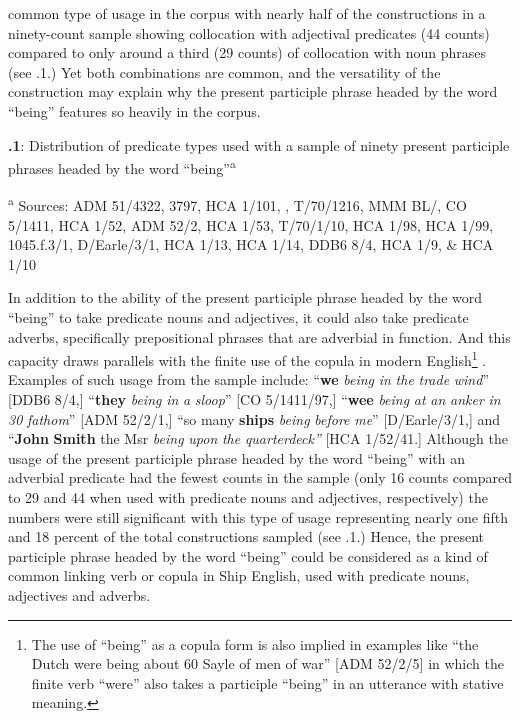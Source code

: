 common type of usage in the corpus with nearly half of the constructions in a ninety-count sample showing collocation with adjectival predicates (44 counts) compared to only around a third (29 counts) of collocation with noun phrases (see .1.) Yet both combinations are common, and the versatility of the construction may explain why the present participle phrase headed by the word “being” features so heavily in the corpus. 


\textbf{.1}: Distribution of predicate types used with a sample of ninety present participle phrases headed by the word “being”\textsuperscript{a} 

\textsuperscript{a} Sources: ADM 51/4322, 3797, HCA 1/101, \citealt{Brown2011}, T/70/1216, MMM BL/\citealt{Egerton2395}, CO 5/1411, HCA 1/52, ADM 52/2, HCA 1/53, T/70/1/10, HCA 1/98, HCA 1/99, 1045.f.3/1, D/Earle/3/1, HCA 1/13, HCA 1/14, DDB6 8/4, HCA 1/9, \& HCA 1/10

In addition to the ability of the present participle phrase headed by the word “being” to take predicate nouns and adjectives, it could also take predicate adverbs, specifically prepositional phrases that are adverbial in function. And this capacity draws parallels with the finite use of the copula in modern English\footnote{The use of “being” as a copula form is also implied in examples like “the Dutch were being about 60 Sayle of men of war” [ADM 52/2/5] in which the finite verb “were” also takes a participle “being” in an utterance with stative meaning.} . Examples of such usage from the sample include: “\textbf{we} \textit{being} \textit{in} \textit{the} \textit{trade} \textit{wind}” [DDB6 8/4,] “\textbf{they} \textit{being} \textit{in} \textit{a} \textit{sloop}” [CO 5/1411/97,] “\textbf{wee} \textit{being} \textit{at} \textit{an} \textit{anker} \textit{in} \textit{30} \textit{fathom}” [ADM 52/2/1,] “so many \textbf{ships} \textit{being} \textit{before} \textit{me}” [D/Earle/3/1,] and “\textbf{John} \textbf{Smith} the Msr \textit{being} \textit{upon} \textit{the} \textit{quarterdeck”} [HCA 1/52/41.] Although the usage of the present participle phrase headed by the word “being” with an adverbial predicate had the fewest counts in the sample (only 16 counts compared to 29 and 44 when used with predicate nouns and adjectives, respectively) the numbers were still significant with this type of usage representing nearly one fifth and 18 percent of the total constructions sampled (see .1.) Hence, the present participle phrase headed by the word “being” could be considered as a kind of common linking verb or copula in Ship English, used with predicate nouns, adjectives and adverbs. 

